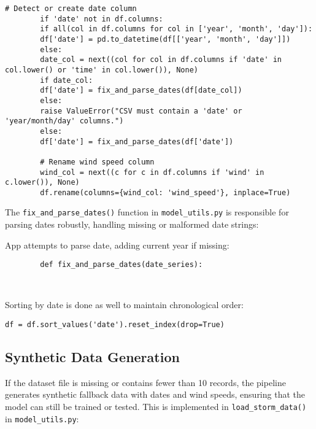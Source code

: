 \begin{framed}
	\begin{lstlisting}[breaklines=true, basicstyle=\ttfamily\small]
		# Detect or create date column
		if 'date' not in df.columns:
		if all(col in df.columns for col in ['year', 'month', 'day']):
		df['date'] = pd.to_datetime(df[['year', 'month', 'day']])
		else:
		date_col = next((col for col in df.columns if 'date' in col.lower() or 'time' in col.lower()), None)
		if date_col:
		df['date'] = fix_and_parse_dates(df[date_col])
		else:
		raise ValueError("CSV must contain a 'date' or 'year/month/day' columns.")
		else:
		df['date'] = fix_and_parse_dates(df['date'])
		
		# Rename wind speed column
		wind_col = next((c for c in df.columns if 'wind' in c.lower()), None)
		df.rename(columns={wind_col: 'wind_speed'}, inplace=True)
	\end{lstlisting}
\end{framed}

The \texttt{fix\_and\_parse\_dates()} function in \texttt{model\_utils.py} is responsible for parsing dates robustly, handling missing or malformed date strings:



 App attempts to parse date, adding current year if missing:
\begin{framed}
	\begin{verbatim}
		def fix_and_parse_dates(date_series):
	
		
	\end{verbatim}
\end{framed}


Sorting by date is done as well to maintain chronological order:

\lstset{breaklines=true}
\begin{framed}
	\begin{lstlisting}[basicstyle=\ttfamily\small]
		df = df.sort_values('date').reset_index(drop=True)
	\end{lstlisting}
\end{framed}




\subsection{Synthetic Data Generation}

If the dataset file is missing or contains fewer than 10 records, the pipeline generates synthetic fallback data with dates and wind speeds, ensuring that the model can still be trained or tested. This is implemented in \texttt{load\_storm\_data()} in \texttt{model\_utils.py}:

